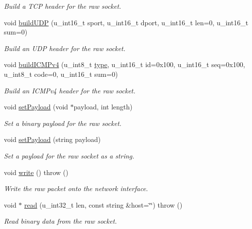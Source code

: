 \begin{CompactItemize}
\begin{CompactList}\small\item\em Build a TCP header for the raw socket. \item\end{CompactList}\item 
void \hyperlink{classRawSocket_90915831a7ac1046e07635da346a54fe}{buildUDP} (u\_\-int16\_\-t sport, u\_\-int16\_\-t dport, u\_\-int16\_\-t len=0, u\_\-int16\_\-t sum=0)
\begin{CompactList}\small\item\em Build an UDP header for the raw socket. \item\end{CompactList}\item 
void \hyperlink{classRawSocket_07d676b2f5becf9fad465b7f63f9d3a3}{buildICMPv4} (u\_\-int8\_\-t \hyperlink{classSocket_c7f6980f36023df2004271c336217cb8}{type}, u\_\-int16\_\-t id=0x100, u\_\-int16\_\-t seq=0x100, u\_\-int8\_\-t code=0, u\_\-int16\_\-t sum=0)
\begin{CompactList}\small\item\em Build an ICMPv4 header for the raw socket. \item\end{CompactList}\item 
void \hyperlink{classRawSocket_4969ba6947943aed82dc3cebb5c0f708}{setPayload} (void $\ast$payload, int length)
\begin{CompactList}\small\item\em Set a binary payload for the raw socket. \item\end{CompactList}\item 
void \hyperlink{classRawSocket_a987d5f171d49fab97e1b3d6f56b4bb4}{setPayload} (string payload)
\begin{CompactList}\small\item\em Set a payload for the raw socket as a string. \item\end{CompactList}\item 
void \hyperlink{classRawSocket_149999a5d231c93e206be89eec9732b8}{write} ()  throw ()
\begin{CompactList}\small\item\em Write the raw packet onto the network interface. \item\end{CompactList}\item 
void $\ast$ \hyperlink{classRawSocket_18c53c49d965a0ce7652162af8b7a571}{read} (u\_\-int32\_\-t len, const string \&host=\char`\"{}\char`\"{})  throw ()
\begin{CompactList}\small\item\em Read binary data from the raw socket. \item\end{CompactList}\end{CompactItemize}


